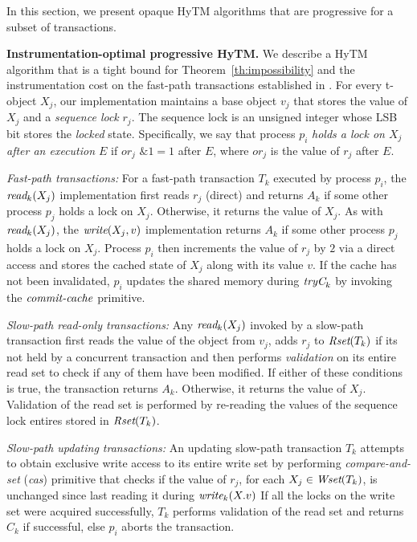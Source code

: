 In this section, we present opaque HyTM algorithms that are progressive for a subset of transactions.

\vspace{1mm}\noindent\textbf{Instrumentation-optimal progressive HyTM.}
We describe a HyTM algorithm that is a tight bound for Theorem~\ref{th:impossibility} and the instrumentation cost on the fast-path transactions established in \cite{hytm14disc}.
For every t-object $X_j$, our implementation maintains a base object $v_j$ that stores the value of $X_j$
and a \emph{sequence lock} $r_{j}$. The sequence lock is an unsigned integer whose LSB bit stores the \emph{locked} state.
Specifically, we say that process $p_i$ \emph{holds a lock on $X_j$ after an execution $E$} if
$\textit{or}_j$ $\mathrel{\&} 1=1$ after $E$, where $\textit{or}_j$ is the value of $r_j$ after $E$.

\vspace{1mm}\noindent\textit{Fast-path transactions:}
For a fast-path transaction $T_k$ executed by process $p_i$, the $\textit{read}_k(X_j)$ implementation first reads $r_j$ (direct)
and returns $A_k$ if some other process $p_j$ holds a lock on $X_j$.
Otherwise, it returns the value of $X_j$.
As with $\textit{read}_k(X_j)$, the $\textit{write} (X_j,v)$ implementation returns $A_k$ if some other process $p_j$ holds a lock on $X_j$.
Process $p_i$ then increments the value of $r_j$ by $2$ via a direct access and stores the cached state of $X_j$ along with its value $v$.
If the cache has not been invalidated, $p_i$ updates the shared memory
during $\textit{tryC}_k$ by invoking the $\ms{commit-cache}$ primitive.

\vspace{1mm}\noindent\textit{Slow-path read-only transactions:}
Any $\textit{read}_k(X_j)$ invoked by a slow-path transaction first reads the value of the object from $v_j$, 
adds $r_j$ to $\textit{Rset}(T_k)$ if its not held by a concurrent transaction
and then performs \emph{validation} on its entire read set to check if any of them have been modified. 
If either of these conditions is true,
the transaction returns $A_k$. Otherwise, it returns the value of $X_j$. 
Validation of the read set is performed by re-reading the values of the sequence lock entires stored in $\textit{Rset}(T_k)$.

\vspace{1mm}\noindent\textit{Slow-path updating transactions:}
An updating slow-path transaction $T_k$ attempts to obtain exclusive write access to its 
entire write set by performing \emph{compare-and-set} (\emph{cas})
primitive that checks if the value of $r_j$, for each $X_j\in \textit{Wset}(T_k)$, is unchanged since last reading it during $\textit{write}_k(X.v)$
If all the locks on the write set were acquired successfully, $T_k$ performs validation of the read set and returns $C_k$ if successful, else $p_i$ aborts the transaction.

